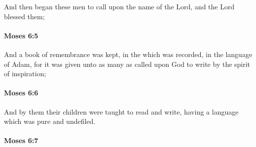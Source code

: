 			And then began these men to call upon the name of the Lord, and the Lord blessed them;


		\paragraph{Moses 6:5} %
			\label{MOSES-6-5}

			And a book of remembrance was kept, in the which was recorded, in the language of Adam, for it was given unto as many as called upon God to write by the spirit of inspiration;


		\paragraph{Moses 6:6} %
			\label{MOSES-6-6}

			And by them their children were taught to read and write, having a language which was pure and undefiled.


		\paragraph{Moses 6:7} %
			\label{MOSES-6-7}

